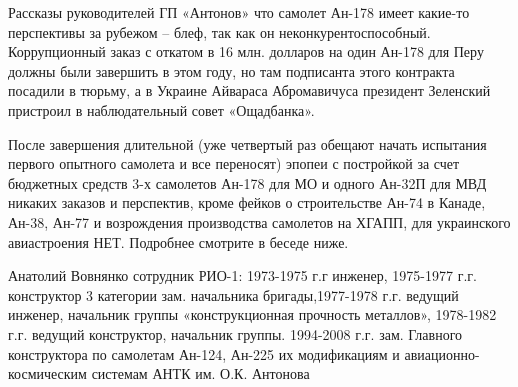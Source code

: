 Рассказы руководителей ГП «Антонов» что самолет Ан-178 имеет какие-то
перспективы за рубежом – блеф, так как он неконкурентоспособный. Коррупционный
заказ с откатом в 16 млн. долларов на один Ан-178 для Перу должны были
завершить в этом году, но там подписанта этого контракта посадили в тюрьму, а в
Украине Айвараса Абромавичуса президент Зеленский пристроил в наблюдательный
совет «Ощадбанка».

После завершения длительной (уже четвертый раз обещают начать испытания первого
опытного самолета и все переносят) эпопеи с постройкой за счет бюджетных
средств 3-х самолетов Ан-178 для МО и одного Ан-32П для МВД никаких заказов и
перспектив, кроме фейков о строительстве Ан-74 в Канаде, Ан-38, Ан-77 и
возрождения производства самолетов на ХГАПП, для украинского авиастроения НЕТ.
Подробнее смотрите в беседе ниже. 


Анатолий Вовнянко сотрудник РИО-1: 1973-1975 г.г инженер, 1975-1977 г.г.
конструктор 3 категории зам. начальника бригады,1977-1978 г.г. ведущий инженер,
начальник группы «конструкционная прочность металлов», 1978-1982 г.г. ведущий
конструктор, начальник группы. 1994-2008 г.г. зам. Главного конструктора по
самолетам Ан-124, Ан-225 их модификациям и авиационно-космическим системам АНТК
им. О.К. Антонова
